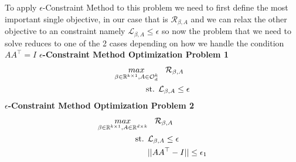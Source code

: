 To apply $\epsilon$-Constraint Method to this problem we need to first define the most important single objective, in our case that is $\mathcal{R}_{\beta, A}$ and we can relax the other objective to an constraint namely $\mathcal{L}_{\beta, A} \le \epsilon$ so now the problem that we need to solve reduces to one of the 2 cases depending on how we handle the condition $AA^\top = I$
\newline \textbf{$\epsilon$-Constraint Method Optimization Problem 1}
\begin{equation} \label{ECMOP_1}
\begin{aligned}
    \underset{\beta\in \mathbb{R}^{k\times 1},A\in \mathcal{O}^{k}_{d}}{max}& \hspace{3mm} \mathcal{R}_{\beta, A}\\
    \text{st.  }& \mathcal{L}_{\beta, A} \le \epsilon
\end{aligned}
\end{equation}
\newline \textbf{$\epsilon$-Constraint Method Optimization Problem 2}
\begin{equation} \label{ECMOP_2}
\begin{aligned}
    \underset{\beta\in \mathbb{R}^{k\times 1},A\in \mathbb{R}^{d\times k}}{max}& \hspace{3mm} \mathcal{R}_{\beta, A}\\
    \text{st.  }& \mathcal{L}_{\beta, A} \le \epsilon\\
     & ||AA^\top - I|| \le \epsilon_1
\end{aligned}
\end{equation}

